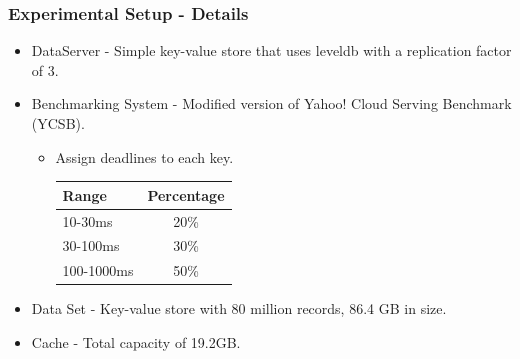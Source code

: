 \documentclass{beamer}
\begin{document}
\begin{frame}
  \frametitle{Experimental Setup - Details}
  \begin{itemize}
  \item DataServer - Simple key-value store that uses leveldb with a
    replication factor of 3.
  \item Benchmarking System - Modified version of Yahoo! Cloud Serving
    Benchmark (YCSB).
    \begin{itemize}
    \item Assign deadlines to each key.\\
      \begin{tabular}{| l | c |}
        \hline
        Range & Percentage \\ \hline
        10-30ms & 20\% \\ \hline
        30-100ms & 30\% \\ \hline
        100-1000ms & 50\% \\ \hline
      \end{tabular}
    \end{itemize}
  \item Data Set - Key-value store with 80 million records, 86.4 GB in size.
  \item Cache - Total capacity of 19.2GB.
  \end{itemize}
\end{frame}


\end{document}

